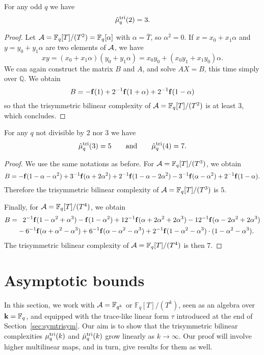\documentclass[11pt]{article}
\begin{document}
\begin{prop}For any odd $q$ we have
\[
  \hat\mu^{\textrm{tri}}_q(2) = 3.
\]
\end{prop}
\begin{proof}
Let $\mathcal{A} = \mathbb{F}_{q}[T]/(T^2) = \mathbb{F}_q[\alpha]$ with $\alpha=\bar T$, so $\alpha^2=0$.
If $x = x_0 + x_1\alpha$ and $y = y_0 + y_1\alpha$ are two elements of
$\mathcal{A}$, we have
\[
  xy = (x_0+x_1\alpha)(y_0+y_1\alpha)=x_0y_0+
  (x_0y_1+x_1y_0)\alpha.
\]
We can again construct the matrix $B$ and $A$, and solve $AX=B$, this time
simply over
$\mathbb{Q}$. We obtain
\[
  B = -\mathbf{f}(1) + 2^{-1}\mathbf{f}(1+\alpha)+2^{-1}\mathbf{f}(1-\alpha)
\]
so that the trisymmetric bilinear complexity of
$\mathcal{A}=\mathbb{F}_q[T]/(T^2)$ is at least $3$, which concludes.
\end{proof}
\begin{prop}For any $q$ not divisible by $2$ nor $3$ we have
\[
  \hat\mu^{\textrm{tri}}_q(3) = 5\qquad\textrm{and}\qquad\hat\mu^{\textrm{tri}}_q(4) = 7.
\]
\end{prop}
\begin{proof}
We use the same notations as before. For
$\mathcal{A}=\mathbb{F}_{q}[T]/(T^3)$, we obtain
\[
  B =
  -\mathbf{f}(1-\alpha-\alpha^2)+3^{-1}\mathbf{f}(\alpha+2\alpha^2)
  +2^{-1}\mathbf{f}(1-\alpha-2\alpha^2) -
  3^{-1}\mathbf{f}(\alpha-\alpha^2)
  +2^{-1}\mathbf{f}(1-\alpha).
\]
Therefore the trisymmetric bilinear complexity of
$\mathcal{A}=\mathbb{F}_q[T]/(T^3)$ is $5$.

Finally, for $\mathcal{A}=\mathbb{F}_{q}[T]/(T^4)$, we obtain
\begin{equation*}
  \begin{split}
    B =&\phantom{-}2^{-1}\mathbf{f}(1-\alpha^2+\alpha^3)-\mathbf{f}(1-\alpha^2)
  +12^{-1}\mathbf{f}(\alpha+2\alpha^2+2\alpha^3)
  -12^{-1}\mathbf{f}(\alpha-2\alpha^2+2\alpha^3)\\
  &-6^{-1}\mathbf{f}(\alpha+\alpha^2-\alpha^3)
  +6^{-1}\mathbf{f}(\alpha-\alpha^2-\alpha^3)
  +2^{-1}\mathbf{f}(1-\alpha^2-\alpha^3)\cdot(1-\alpha^2-\alpha^3).
  \end{split}
\end{equation*}
The trisymmetric bilinear complexity of $\mathcal{A}=\mathbb{F}_q[T]/(T^4)$ is then $7$.
\end{proof}

\section{Asymptotic bounds}
\label{sec:asymptotic}
In this section, we work with $\mathcal{A}=\mathbb{F}_{q^k}$ or $\mathbb{F}_q[T]/(T^k)$, seen as an algebra over $\mathbf{k}=\mathbb{F}_q$, and equipped with the trace-like linear form $\tau$ introduced at the end of Section~\ref{sec:symtrisym}.
Our aim is to show that the trisymmetric bilinear complexities $\mu^{\textrm{tri}}_q(k)$ and $\hat\mu^{\textrm{tri}}_q(k)$ grow linearly as $k\to\infty$.
Our proof will involve higher multilinear maps, and in turn, give results for them as well.
\end{document}
